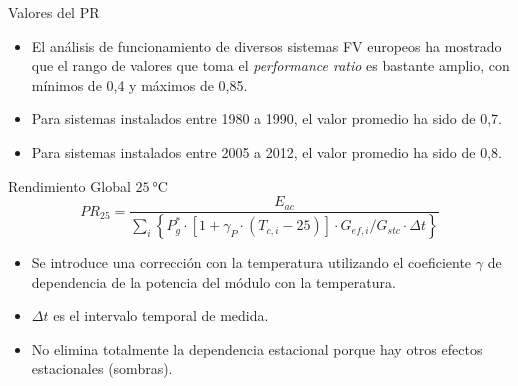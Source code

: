 \documentclass[aspectratio=169, usenames,svgnames,dvipsnames]{beamer}
\begin{document}
\begin{frame}[label={sec:orgf60e272}]{Valores del PR}
\begin{itemize}
\item El análisis de funcionamiento de diversos sistemas FV europeos ha
mostrado que el rango de valores que toma el \emph{performance ratio} es
bastante amplio, con mínimos de 0,4 y máximos de 0,85.

\item Para sistemas instalados entre 1980 a 1990, \alert{el valor promedio ha sido de
0,7}.

\item Para sistemas instalados entre 2005 a 2012, \alert{el valor promedio ha
sido de 0,8}.
\end{itemize}
\end{frame}


\begin{frame}[label={sec:org292cc69}]{Rendimiento Global \(\qty{25}{\celsius}\)}
\[
  PR_{25} = \frac{E_{ac}}{\sum_i \left\{P_g^* \cdot \left[1 + \gamma_P \cdot(T_{c,i} - 25)\right]\cdot G_{ef,i}/G_{stc} \cdot \Delta t \right\}}
\]
\begin{itemize}
\item Se introduce una corrección con la temperatura utilizando el coeficiente \(\gamma\) de dependencia de la potencia del módulo con la temperatura.
\item \(\Delta t\) es el intervalo temporal de medida.
\item No elimina totalmente la dependencia estacional porque hay otros efectos estacionales (sombras).
\end{itemize}
\end{frame}
\end{document}

